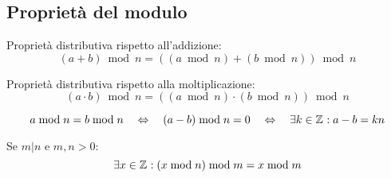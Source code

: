\subsection{Proprietà del modulo}

\begin{proposizione}
    \label{prop:distri_mod_add}
    Proprietà distributiva rispetto all'addizione:
    \begin{equation*}
        \left( a+b \right)
        \bmod n 
        =
        \left( 
            \left( 
                a \bmod n
            \right)
            +
            \left( 
                b \bmod n 
            \right)
        \right)
        \bmod n 
    \end{equation*}
\end{proposizione}

\begin{proposizione}
    Proprietà distributiva rispetto alla moltiplicazione:
    \begin{equation*}
        \left( a \cdot b \right)
        \bmod n 
        =
        \left( 
            \left( 
                a \bmod n
            \right)
            \cdot
            \left( 
                b \bmod n 
            \right)
        \right)
        \bmod n 
    \end{equation*}
\end{proposizione}

\begin{proposizione}
    \label{prop:mod_differenza}
    \begin{equation*}
        a \bmod n = b \bmod n 
        \quad
        \Leftrightarrow
        \quad
        ( a - b ) \bmod n = 0
        \quad
        \Leftrightarrow
        \quad
        \exists k \in \mathbb{Z}_{}
        :
        a - b = kn
    \end{equation*}
\end{proposizione}

\begin{proposizione}
    \label{prop:mod_elimina_interno}
    Se $m | n$ e $m, n > 0$:
    \begin{equation*}
        \exists x \in \mathbb{Z}_{}
        :
        \left( 
            x \bmod n 
        \right)
        \bmod m
        =
        x \bmod m
    \end{equation*}
\end{proposizione}

